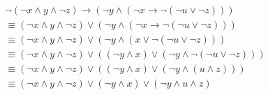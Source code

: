 \documentclass[12pt,a4paper]{article}
\begin{document}
\begin{multline*}
\lnot(\lnot x\wedge y\wedge\lnot z)\rightarrow(\lnot y\wedge(\lnot x\rightarrow \lnot(\lnot u\lor\lnot z)))\\
\equiv(\lnot x\wedge y\wedge\lnot z)\lor(\lnot y\wedge(\lnot x\rightarrow \lnot(\lnot u\lor\lnot z)))\\
\equiv(\lnot x\wedge y\wedge\lnot z)\lor(\lnot y\wedge( x\lor \lnot(\lnot u\lor\lnot z)))\\
\equiv(\lnot x\wedge y\wedge\lnot z)\lor((\lnot y\wedge x) \lor (\lnot y\wedge\lnot(\lnot u\lor\lnot z))) \\
\equiv(\lnot x\wedge y\wedge\lnot z)\lor((\lnot y\wedge x) \lor (\lnot y\wedge( u\wedge z))) \\
\equiv(\lnot x\wedge y\wedge\lnot z)\lor(\lnot y\wedge x) \lor (\lnot y\wedge u\wedge z)
\end{multline*}
\end{document}
